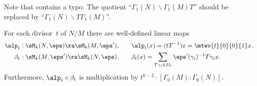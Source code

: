 \begin{remark}
Note that \cite[\S2.6]{merel:1585} contains a typo:
 The quotient ``$\Gamma_1(N)\backslash\Gamma_1(M)T$'' should be replaced 
by ``$\Gamma_1(N)\backslash T\Gamma_1(M)$''.
\end{remark}
\begin{proposition}
For each divisor~$t$ of $N/M$ there are well-defined linear maps
\begin{align*}
\alp_t : \sM_k(N,\eps) \ra \sM_k(M,\eps'),&\qquad
      \alp_t(x) = (tT^{-1})x = \mtwo{t}{0}{0}{1} x,\\
\beta_t : \sM_k(M,\eps') \ra \sM_k(N,\eps),&\qquad
      \beta_t(x) = \sum_{T\gamma_i\in D_t} \eps'(\gamma_i)^{-1}T\gamma_i{} x.
\end{align*}
Furthermore,
  $\alp_t\circ \beta_t$ is multiplication by 
  $t^{k-2}\cdot [\Gamma_0(M) : \Gamma_0(N)].$
\end{proposition}

